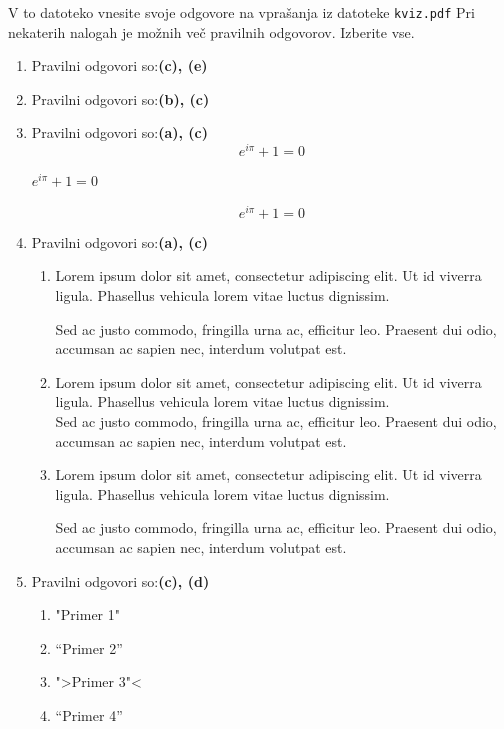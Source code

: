\documentclass[11pt]{article}
\begin{document}
V to datoteko vnesite svoje odgovore na vprašanja iz datoteke \texttt{kviz.pdf}
Pri nekaterih nalogah je možnih več pravilnih odgovorov. Izberite vse.

\begin{enumerate}
    \item Pravilni odgovori so:\textbf{(c), (e)}%
    
    \item Pravilni odgovori so:\textbf{(b), (c)}%
    
    \item Pravilni odgovori so:\textbf{(a), (c)}%
      \[ e^{i \pi} + 1 = 0 \]
      \begin{center}
          \( e^{i \pi} + 1 = 0 \)
      \end{center}
      \begin{equation*}
          e^{i \pi} + 1 = 0
      \end{equation*}

    \item Pravilni odgovori so:\textbf{(a), (c)}%
        \begin{enumerate}
            \item {
Lorem ipsum dolor sit amet, consectetur adipiscing 
elit. Ut id viverra ligula. Phasellus vehicula lorem 
vitae luctus dignissim. 
                
Sed ac justo commodo, fringilla urna ac, efficitur 
leo. Praesent dui odio, accumsan ac sapien nec, 
interdum volutpat est. 
            }
            \item {
Lorem ipsum dolor sit amet, consectetur adipiscing 
elit. Ut id viverra ligula. Phasellus vehicula lorem 
vitae luctus dignissim. \\
Sed ac justo commodo, fringilla urna ac, efficitur 
leo. Praesent dui odio, accumsan ac sapien nec, 
interdum volutpat est.             }
            \item {
Lorem ipsum dolor sit amet, consectetur adipiscing 
elit. Ut id viverra ligula. Phasellus vehicula lorem 
vitae luctus dignissim. \par
Sed ac justo commodo, fringilla urna ac, efficitur 
leo. Praesent dui odio, accumsan ac sapien nec, 
interdum volutpat est.             }
        \end{enumerate}
    
      \item Pravilni odgovori so:\textbf{(c), (d)}%
        \begin{enumerate}
          \item "Primer 1"
          \item ``Primer 2''
          \item ">Primer 3"<
          \item "`Primer 4"'
        \end{enumerate}


\end{enumerate}
\end{document}
